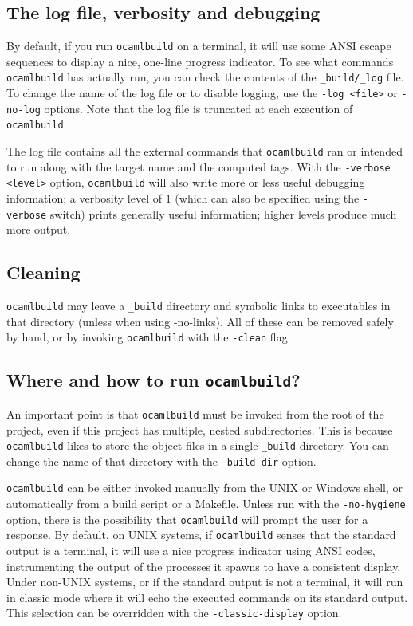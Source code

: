 \documentclass[9pt]{article}
\newcommand{\ocb}{\texttt{ocamlbuild}\xspace}
\begin{document}
\subsection{The log file, verbosity and debugging}
By default, if you run \ocb on a terminal, it will use some ANSI escape sequences
to display a nice, one-line progress indicator.  To see what commands \ocb has actually run,
you can check the contents of the \texttt{\_build/\_log} file.  To change the name of the
log file or to disable logging, use the \texttt{-log <file>} or \texttt{-no-log} options.
Note that the log file is truncated at each execution of \ocb.

The log file contains all the external commands that \ocb ran or intended to
run along with the target name and the computed tags.  With the
\texttt{-verbose <level>} option, \ocb will also write more or less useful
debugging information;  a verbosity level of $1$ (which can also be specified
using the \texttt{-verbose} switch) prints generally useful information; higher
levels produce much more output.
\subsection{Cleaning}
\ocb may leave a \texttt{\_build} directory and symbolic links to executables in
that directory (unless when using -no-links). All of these can be removed safely
by hand, or by invoking \ocb with the \texttt{-clean} flag.
\subsection{Where and how to run \ocb ?}
An important point is that \ocb must be invoked from the root of the project,
even if this project has multiple, nested subdirectories.  This is because \ocb
likes to store the object files in a single \texttt{\_build} directory.  You
can change the name of that directory with the \texttt{-build-dir} option.

\ocb can be either invoked manually from the UNIX or Windows shell, or
automatically from a build script or a Makefile.  Unless run with the
\texttt{-no-hygiene} option, there is the possibility that \ocb will prompt the
user for a response.  By default, on UNIX systems, if \ocb senses that the
standard output is a terminal, it will use a nice progress indicator using ANSI
codes, instrumenting the output of the processes it spawns to have a consistent
display.  Under non-UNIX systems, or if the standard output is not a terminal,
it will run in classic mode where it will echo the executed commands on its
standard output.  This selection can be overridden with the \texttt{-classic-display} option.
\end{document}
